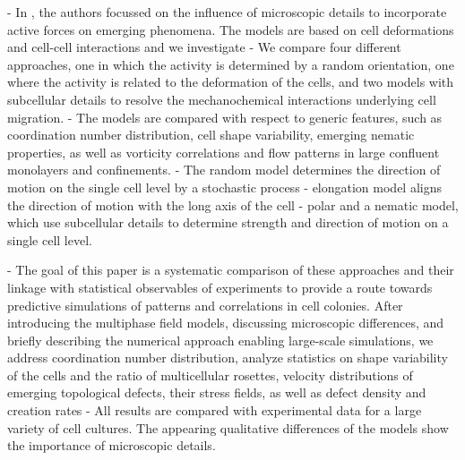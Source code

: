 - In \cite{wenzel2021}, the authors focussed on the influence of microscopic details to incorporate active forces on emerging phenomena.
The models are based on cell deformations and cell-cell interactions and we investigate 
- We compare four different approaches, one in which the activity is determined by a random orientation, one where the activity is related to the deformation of
the cells, and two models with subcellular details to resolve the mechanochemical interactions underlying cell
migration.
- The models are compared with respect to generic features, such as coordination number distribution,
cell shape variability, emerging nematic properties, as well as vorticity correlations and flow patterns in large
confluent monolayers and confinements. 
- The random model determines the direction of motion on the single cell level by a stochastic process
- elongation model aligns the direction of motion with the long axis of the cell
- polar and a nematic model, which use subcellular details to determine strength and direction of motion on a single cell level.

- The goal of this paper is a systematic comparison of these approaches and their linkage with statistical observables of experiments to provide a route towards predictive simulations of patterns and correlations in cell colonies. After introducing the multiphase field models, discussing microscopic differences, and briefly describing the numerical approach enabling large-scale simulations, we address coordination number distribution, analyze statistics on shape variability of the cells and the ratio of multicellular rosettes, velocity distributions of emerging topological defects, their stress fields, as well as defect density and creation rates
- All results are compared with experimental data for a large variety of cell cultures. The appearing qualitative differences of the models show the importance of microscopic details.

